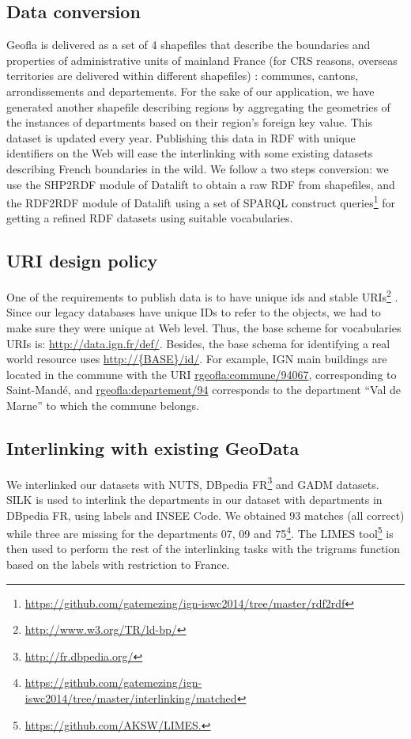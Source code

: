 \subsection{Data conversion}
\label{sec:dconversion}
Geofla  is delivered as a set of 4 shapefiles  that describe the boundaries and properties of administrative units of mainland France (for CRS reasons, overseas territories are delivered within different shapefiles) : communes, cantons, arrondissements and departements. For the sake of our application, we have generated another shapefile describing regions by aggregating the geometries of the instances of departments based on their region's foreign key value. This  dataset is updated every year.  Publishing this data in RDF with unique identifiers on the Web will ease the interlinking with some existing datasets describing French boundaries in the wild. We follow a two steps conversion: we use the SHP2RDF module of Datalift to obtain a raw RDF from shapefiles, and the RDF2RDF module of Datalift  using a set of SPARQL construct queries\footnote{ \url{https://github.com/gatemezing/ign-iswc2014/tree/master/rdf2rdf}} for getting a refined RDF datasets using suitable vocabularies.

\subsection{URI design policy} \label{sec:urigeofla}

One of the requirements to publish data is to have unique ids and stable URIs\footnote{\url{http://www.w3.org/TR/ld-bp/}} . Since our legacy databases have unique IDs to refer to the objects, we had to make sure they were unique at Web level. Thus, the base scheme for vocabularies URIs is: \url{http://data.ign.fr/def/}. Besides, the base schema for identifying a real world resource uses \url{http://{BASE}/id/}. For example, IGN main buildings  are located in the commune with the URI \url{rgeofla:commune/94067}, corresponding to Saint-Mand\'{e}, and \url{rgeofla:departement/94} corresponds to the department ``Val de Marne'' to which the commune belongs.



\subsection{Interlinking with existing GeoData} \label{sec:mapping}
We interlinked our datasets with NUTS, DBpedia FR\footnote{\url{http://fr.dbpedia.org/}} and GADM datasets. SILK \cite{jentzsch2010silk} is used to interlink the departments in our dataset with departments in DBpedia FR, using labels and INSEE Code. We obtained $93$ matches (all correct) while three are missing for the departments 07, 09 and 75\footnote{\url{https://github.com/gatemezing/ign-iswc2014/tree/master/interlinking/matched}}. The 
LIMES tool\footnote{\url{https://github.com/AKSW/LIMES.}} is then used to perform the rest of the interlinking tasks \cite{NGON13} with the trigrams function based on the labels with restriction to France.


